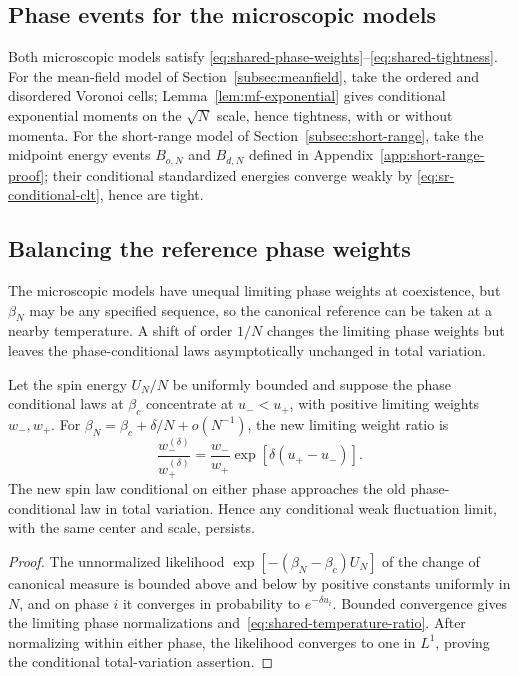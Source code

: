 \subsection{Phase events for the microscopic models}
\label{subsec:shared-microscopic}

Both microscopic models satisfy
\eqref{eq:shared-phase-weights}--\eqref{eq:shared-tightness}. For the
mean-field model of Section~\ref{subsec:meanfield}, take the ordered
and disordered Voronoi cells; Lemma~\ref{lem:mf-exponential} gives
conditional exponential moments on the $\sqrt N$ scale, hence
tightness, with or without momenta. For the short-range model of
Section~\ref{subsec:short-range}, take the midpoint energy events
$B_{o,N}$ and $B_{d,N}$ defined in
Appendix~\ref{app:short-range-proof}; their conditional standardized
energies converge weakly by \eqref{eq:sr-conditional-clt}, hence are
tight.

\subsection{Balancing the reference phase weights}
\label{subsec:shared-balancing}

The microscopic models have unequal limiting phase weights at
coexistence, but $\beta_N$ may be any specified sequence, so the
canonical reference can be taken at a nearby temperature. A shift of
order $1/N$ changes the limiting phase weights but leaves the
phase-conditional laws asymptotically unchanged in total variation.

\begin{lemma}
\label{lem:shared-temperature-shift}
Let the spin energy $U_N/N$ be uniformly bounded and suppose the phase
conditional laws at $\beta_c$ concentrate at $u_-<u_+$, with positive
limiting weights $w_-,w_+$. For
$\beta_N=\beta_c+\delta/N+o(N^{-1})$, the new limiting weight ratio is
\begin{equation}
 \frac{w_-^{(\delta)}}{w_+^{(\delta)}}
       =\frac{w_-}{w_+}\exp[\delta(u_+-u_-)].
 \label{eq:shared-temperature-ratio}
\end{equation}
The new spin law conditional on either phase approaches the old
phase-conditional law in total variation. Hence any conditional weak
fluctuation limit, with the same center and scale, persists.
\end{lemma}
\begin{proof}
The unnormalized likelihood $\exp[-(\beta_N-\beta_c)U_N]$ of the
change of canonical measure is bounded above and below by positive
constants uniformly in $N$, and on phase $i$ it converges in
probability to $e^{-\delta u_i}$. Bounded convergence gives the
limiting phase normalizations and~\eqref{eq:shared-temperature-ratio}.
After normalizing within either phase, the likelihood converges to
one in $L^1$, proving the conditional total-variation assertion.
\end{proof}

